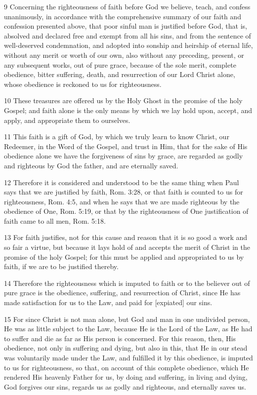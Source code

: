 9 Concerning the righteousness of faith before God we believe, teach, and confess unanimously, in accordance with the comprehensive summary of our faith and confession presented above, that poor sinful man is justified before God, that is, absolved and declared free and exempt from all his sins, and from the sentence of well-deserved condemnation, and adopted into sonship and heirship of eternal life, without any merit or worth of our own, also without any preceding, present, or any subsequent works, out of pure grace, because of the sole merit, complete obedience, bitter suffering, death, and resurrection of our Lord Christ alone, whose obedience is reckoned to us for righteousness.

10 These treasures are offered us by the Holy Ghost in the promise of the holy Gospel; and faith alone is the only means by which we lay hold upon, accept, and apply, and appropriate them to ourselves.

11 This faith is a gift of God, by which we truly learn to know Christ, our Redeemer, in the Word of the Gospel, and trust in Him, that for the sake of His obedience alone we have the forgiveness of sins by grace, are regarded as godly and righteous by God the father, and are eternally saved.

12 Therefore it is considered and understood to be the same thing when Paul says that we are justified by faith, Rom. 3:28, or that faith is counted to us for righteousness, Rom. 4:5, and when he says that we are made righteous by the obedience of One, Rom. 5:19, or that by the righteousness of One justification of faith came to all men, Rom. 5:18.

13 For faith justifies, not for this cause and reason that it is so good a work and so fair a virtue, but because it lays hold of and accepts the merit of Christ in the promise of the holy Gospel; for this must be applied and appropriated to us by faith, if we are to be justified thereby.

14 Therefore the righteousness which is imputed to faith or to the believer out of pure grace is the obedience, suffering, and resurrection of Christ, since He has made satisfaction for us to the Law, and paid for [expiated] our sins.

15 For since Christ is not man alone, but God and man in one undivided person, He was as little subject to the Law, because He is the Lord of the Law, as He had to suffer and die as far as His person is concerned. For this reason, then, His obedience, not only in suffering and dying, but also in this, that He in our stead was voluntarily made under the Law, and fulfilled it by this obedience, is imputed to us for righteousness, so that, on account of this complete obedience, which He rendered His heavenly Father for us, by doing and suffering, in living and dying, God forgives our sins, regards us as godly and righteous, and eternally saves us.

